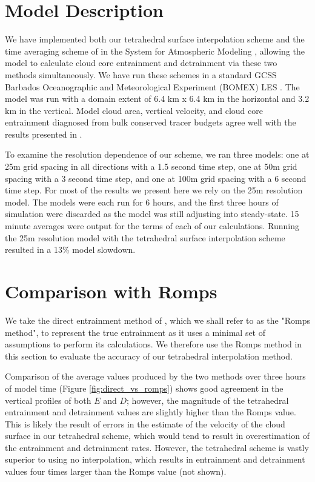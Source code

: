 \documentclass[12pt]{article}
\begin{document}

\section{Model Description}

We have implemented both our tetrahedral surface interpolation scheme and the 
time averaging scheme of \cite{Romps2010} in the System for Atmospheric 
Modeling \citep[SAM;][]{Khairoutdinov2003}, allowing the model to calculate 
cloud core entrainment and detrainment via these two methods simultaneously.
We have run these schemes in a standard GCSS Barbados Oceanographic and 
Meteorological Experiment (BOMEX) LES \citep{Holland1973, Siebesma2003}.  
The model was run with a domain extent of 6.4 km x 6.4 km in 
the horizontal and 3.2 km in the vertical.  Model cloud area, vertical 
velocity, and cloud core entrainment diagnosed from bulk conserved tracer 
budgets agree well with the results presented in \cite{Siebesma2003}.

To examine the resolution dependence of our scheme, we ran three models: one at 
25m grid spacing in all directions with a 1.5 second time step, one at 50m grid 
spacing with a 3 second time step, and one at 100m grid spacing with a 6 second 
time step.  For most of the results we present here we rely on the 25m 
resolution model.  The models were each run for 6 hours, and the first 
three hours of simulation were discarded as the model was still adjusting into 
steady-state.  15 minute averages were output for the terms of each of our 
calculations.  Running the 25m resolution model with the tetrahedral surface 
interpolation scheme resulted in a 13\% model slowdown.  


\section{Comparison with Romps}

We take the direct entrainment method of \cite{Romps2010}, which we shall 
refer to as the "Romps method", to represent the true entrainment as it uses 
a minimal set of assumptions to perform its calculations.  We therefore use 
the Romps method in this section to evaluate the accuracy of our tetrahedral 
interpolation method.

Comparison of the average values produced by the two methods over three hours 
of model time (Figure \ref{fig:direct_vs_romps}) shows good agreement in the 
vertical profiles of both $E$ and $D$; however, the magnitude of the 
tetrahedral entrainment and detrainment values are slightly higher than the 
Romps value.  This is likely the result of errors in the estimate of the 
velocity of the cloud surface in our tetrahedral scheme, which would tend to 
result in overestimation of the entrainment and detrainment rates.  
However, the tetrahedral scheme is vastly superior to using no interpolation, 
which results in entrainment and detrainment values four times larger than 
the Romps value (not shown).  
\end{document}

